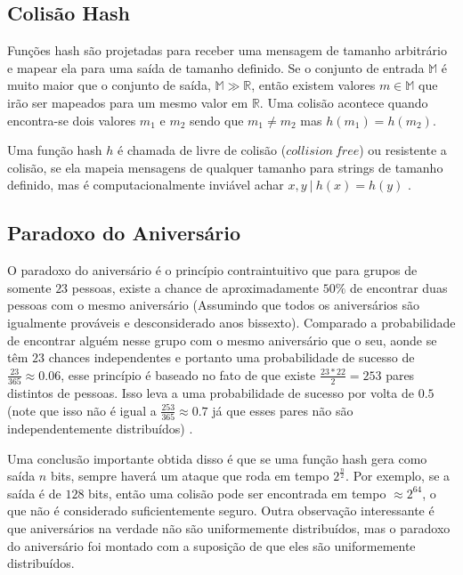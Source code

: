 \documentclass[12pt]{article}
\begin{document}
\subsection{Colisão Hash}

Funções hash são projetadas para receber uma mensagem de tamanho arbitrário e mapear ela para uma saída de 
tamanho definido. Se o conjunto de entrada \(\mathbb{M}\) é muito maior que o conjunto de saída, \(\mathbb{M}
\gg \mathbb{R}\), então existem valores \(m \in \mathbb{M}\) que irão ser mapeados para um mesmo valor em 
\(\mathbb{R}\). Uma colisão acontece quando encontra-se dois valores \(m_1\) e \(m_2\) sendo que \(m_1 \neq m_2\) 
mas \(h(m_1) = h(m_2)\).

Uma função hash \(h\) é chamada de livre de colisão (\(collision\ free\)) ou resistente a colisão, se ela mapeia 
mensagens de qualquer tamanho para strings de tamanho definido, mas é computacionalmente inviável achar \(x, y\ |\ h(x) 
= h(y)\) \cite{damgaard1989design} \cite{menezes1996handbook}.

\subsection{Paradoxo do Aniversário}

O paradoxo do aniversário é o princípio contraintuitivo que para grupos de somente \(23\) pessoas, existe a 
chance de aproximadamente \(50\%\) de encontrar duas pessoas com o mesmo aniversário (Assumindo que
todos os aniversários são igualmente prováveis e desconsiderado anos bissexto). Comparado a probabilidade
de encontrar alguém nesse grupo com o mesmo aniversário que o seu, aonde se têm \(23\) chances independentes
e portanto uma probabilidade de sucesso de \(\frac{23}{365} \approx 0.06\), esse princípio é baseado
no fato de que existe \(\frac{23 * 22}{2} = 253\) pares distintos de pessoas. Isso leva a uma probabilidade
de sucesso por volta de \(0.5\) (note que isso não é igual a \(\frac{253}{365} \approx 0.7\) já que esses
pares não são independentemente distribuídos) \cite{stevens2012attacks}.

Uma conclusão importante obtida disso é que se uma função hash gera como saída \(n\) bits, sempre haverá um ataque que
roda em tempo \(2^\frac{n}{2}\). Por exemplo, se a saída é de \(128\) bits, então uma colisão pode ser encontrada em tempo
\(\approx 2^{64}\), o que não é considerado suficientemente seguro. Outra observação interessante é que aniversários na 
verdade não são uniformemente distribuídos, mas o paradoxo do aniversário foi montado com a suposição de que eles são 
uniformemente distribuídos.
\end{document}

